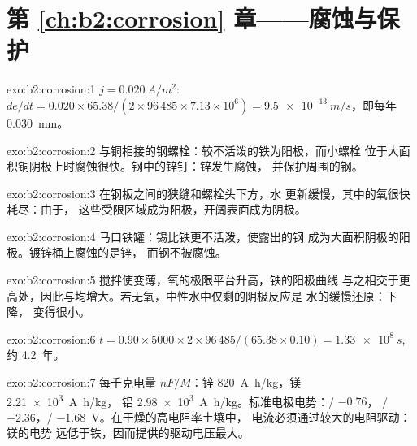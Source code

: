 \section*{第 \ref{ch:b2:corrosion} 章——腐蚀与保护}

\begin{solution}{exo:b2:corrosion:1}
$j = \qty{0.020}{A/m^2}$: $de/dt = 0.020 \times 65.38/(2 \times 96\,485 \times 7.13
\times 10^6) = \qty{9.5e-13}{m/s}$，即每年 \qty{0.030}{mm}。
\end{solution}

\begin{solution}{exo:b2:corrosion:2}
与铜相接的钢螺栓：较不活泼的铁为阳极，而小螺栓
位于大面积铜阴极上时腐蚀很快。钢中的锌钉：锌发生腐蚀，
并保护周围的钢。
\end{solution}

\begin{solution}{exo:b2:corrosion:3}
在钢板之间的狭缝和螺栓头下方，水
更新缓慢，其中的氧很快耗尽：由于，
这些受限区域成为阳极，开阔表面成为阴极。
\end{solution}

\begin{solution}{exo:b2:corrosion:4}
马口铁罐：锡比铁更不活泼，使露出的钢
成为大面积阴极的阳极。镀锌桶上腐蚀的是锌，
而钢不被腐蚀。
\end{solution}

\begin{solution}{exo:b2:corrosion:5}
搅拌使变薄，氧的极限平台升高，铁的阳极曲线
与之相交于更高处，因此与均增大。若无氧，中性水中仅剩的阴极反应是
水的缓慢还原：下降，
变得很小。
\end{solution}

\begin{solution}{exo:b2:corrosion:6}
$t = 0.90 \times 5000 \times 2 \times 96\,485/(65.38 \times 0.10) = \qty{1.33e8}{s}$,
约 4.2~年。
\end{solution}

\begin{solution}{exo:b2:corrosion:7}
每千克电量 $nF/M$：锌 \qty{820}{A.h/kg}，镁 \qty{2.21e3}{A.h/kg}，
铝 \qty{2.98e3}{A.h/kg}。标准电极电势：/ $-0.76$，
/ $-2.36$，/ \qty{-1.68}{V}。在干燥的高电阻率土壤中，
电流必须通过较大的电阻驱动：镁的电势
远低于铁，因而提供的驱动电压最大。
\end{solution}

